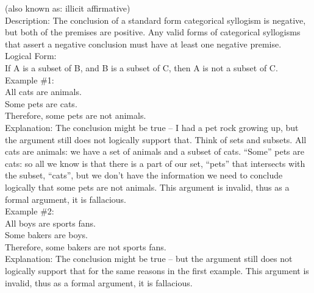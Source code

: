 \documentclass[a4paper,12pt,single,pdftex]{scrbook}
\begin{document}
        (also known as: illicit affirmative)
      \\

      
        Description: The conclusion of a standard form categorical syllogism is negative, but both of the premises are positive.  Any valid forms of categorical syllogisms that assert a negative conclusion must have at least one negative premise.
      \\

      
        Logical Form:
      \\

      
        If A is a subset of B, and B is a subset of C, then A is not a subset of C.
      \\

      
        Example \#1:
      \\

      
        All cats are animals.
      \\

      
        Some pets are cats.
      \\

      
        Therefore, some pets are not animals.
      \\

      
        Explanation: The conclusion might be true -- I had a pet rock growing up, but the argument still does not logically support that.  Think of sets and subsets.  All cats are animals: we have a set of animals and a subset of cats.  “Some” pets are cats: so all we know is that there is a part of our set, “pets” that intersects with the subset, “cats”, but we don’t have the information we need to conclude logically that some pets are not animals.  This argument is invalid, thus as a formal argument, it is fallacious.
      \\

      
        Example \#2:
      \\

      
        All boys are sports fans.
      \\

      
        Some bakers are boys.
      \\

      
        Therefore, some bakers are not sports fans.
      \\

      
        Explanation: The conclusion might be true -- but the argument still does not logically support that for the same reasons in the first example.  This argument is invalid, thus as a formal argument, it is fallacious.
      \\
\end{document}
